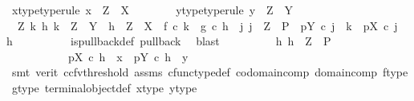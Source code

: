\begin{isabellebody}
\ x{\isacharunderscore}{\kern0pt}type{\isacharbrackleft}{\kern0pt}type{\isacharunderscore}{\kern0pt}rule{\isacharbrackright}{\kern0pt}{\isacharcolon}{\kern0pt}\ {\isachardoublequoteopen}x\ {\isacharcolon}{\kern0pt}\ Z\ {\isasymrightarrow}\ X{\isachardoublequoteclose}\isanewline
\ \ \ \ \ \ \isamarkupfalse%
\ y{\isacharunderscore}{\kern0pt}type{\isacharbrackleft}{\kern0pt}type{\isacharunderscore}{\kern0pt}rule{\isacharbrackright}{\kern0pt}{\isacharcolon}{\kern0pt}\ {\isachardoublequoteopen}y\ {\isacharcolon}{\kern0pt}\ Z\ {\isasymrightarrow}\ Y{\isachardoublequoteclose}\isanewline
\ \ \ \ \ \ \isamarkupfalse%
\ \ {\isachardoublequoteopen}{\isasymAnd}Z\ k\ h{\isachardot}{\kern0pt}\ k\ {\isacharcolon}{\kern0pt}\ Z\ {\isasymrightarrow}\ Y\ {\isasymLongrightarrow}\ h\ {\isacharcolon}{\kern0pt}\ Z\ {\isasymrightarrow}\ X\ {\isasymLongrightarrow}\ f\ {\isasymcirc}\isactrlsub c\ k\ {\isacharequal}{\kern0pt}\ g\ {\isasymcirc}\isactrlsub c\ h\ {\isasymLongrightarrow}\ {\isasymexists}j{\isachardot}{\kern0pt}\ j\ {\isacharcolon}{\kern0pt}\ Z\ {\isasymrightarrow}\ P\ {\isasymand}\ pY\ {\isasymcirc}\isactrlsub c\ j\ {\isacharequal}{\kern0pt}\ k\ {\isasymand}\ pX\ {\isasymcirc}\isactrlsub c\ j\ {\isacharequal}{\kern0pt}\ h{\isachardoublequoteclose}\isanewline
\ \ \ \ \ \ \ \ \isamarkupfalse%
\ is{\isacharunderscore}{\kern0pt}pullback{\isacharunderscore}{\kern0pt}def\ pullback\ \isamarkupfalse%
\ blast\isanewline
\ \ \ \ \ \ \isamarkupfalse%
\ \isamarkupfalse%
\ {\isachardoublequoteopen}{\isasymexists}h{\isachardot}{\kern0pt}\ h\ {\isacharcolon}{\kern0pt}\ Z\ {\isasymrightarrow}\ P\ {\isasymand}\isanewline
\ \ \ \ \ \ \ \ \ \ \ pX\ {\isasymcirc}\isactrlsub c\ h\ {\isacharequal}{\kern0pt}\ x\ {\isasymand}\ pY\ {\isasymcirc}\isactrlsub c\ h\ {\isacharequal}{\kern0pt}\ y{\isachardoublequoteclose}\isanewline
\ \ \ \ \ \ \ \ \isamarkupfalse%
\ {\isacharparenleft}{\kern0pt}smt\ {\isacharparenleft}{\kern0pt}verit{\isacharcomma}{\kern0pt}\ ccfv{\isacharunderscore}{\kern0pt}threshold{\isacharparenright}{\kern0pt}\ assms\ cfunc{\isacharunderscore}{\kern0pt}type{\isacharunderscore}{\kern0pt}def\ codomain{\isacharunderscore}{\kern0pt}comp\ domain{\isacharunderscore}{\kern0pt}comp\ f{\isacharunderscore}{\kern0pt}type\ g{\isacharunderscore}{\kern0pt}type\ terminal{\isacharunderscore}{\kern0pt}object{\isacharunderscore}{\kern0pt}def\ x{\isacharunderscore}{\kern0pt}type\ y{\isacharunderscore}{\kern0pt}type{\isacharparenright}{\kern0pt}\isanewline
\ \ \ \ \ \ \isamarkupfalse%

\end{isabellebody}
